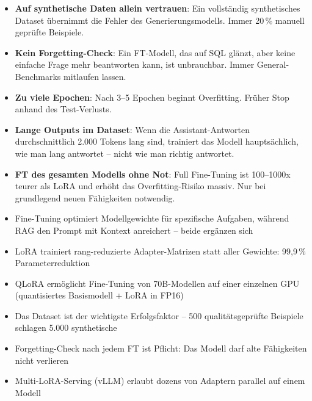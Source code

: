 \begin{itemize}[leftmargin=*]
    \item \textbf{Auf synthetische Daten allein vertrauen}: Ein vollständig synthetisches Dataset übernimmt die Fehler des Generierungsmodells. Immer 20\,\% manuell geprüfte Beispiele.
    \item \textbf{Kein Forgetting-Check}: Ein FT-Modell, das auf SQL glänzt, aber keine einfache Frage mehr beantworten kann, ist unbrauchbar. Immer General-Benchmarks mitlaufen lassen.
    \item \textbf{Zu viele Epochen}: Nach 3--5 Epochen beginnt Overfitting. Früher Stop anhand des Test-Verlusts.
    \item \textbf{Lange Outputs im Dataset}: Wenn die Assistant-Antworten durchschnittlich 2.000 Tokens lang sind, trainiert das Modell hauptsächlich, wie man lang antwortet -- nicht wie man richtig antwortet.
    \item \textbf{FT des gesamten Modells ohne Not}: Full Fine-Tuning ist 100--1000x teurer als LoRA und erhöht das Overfitting-Risiko massiv. Nur bei grundlegend neuen Fähigkeiten notwendig.
\end{itemize}

\begin{zusammenfassung}
\begin{itemize}[leftmargin=*]
    \item Fine-Tuning optimiert Modellgewichte für spezifische Aufgaben, während RAG den Prompt mit Kontext anreichert -- beide ergänzen sich
    \item LoRA trainiert rang-reduzierte Adapter-Matrizen statt aller Gewichte: 99,9\,\% Parameterreduktion
    \item QLoRA ermöglicht Fine-Tuning von 70B-Modellen auf einer einzelnen GPU (quantisiertes Basismodell + LoRA in FP16)
    \item Das Dataset ist der wichtigste Erfolgsfaktor -- 500 qualitätsgeprüfte Beispiele schlagen 5.000 synthetische
    \item Forgetting-Check nach jedem FT ist Pflicht: Das Modell darf alte Fähigkeiten nicht verlieren
    \item Multi-LoRA-Serving (vLLM) erlaubt dozens von Adaptern parallel auf einem Modell
\end{itemize}
\end{zusammenfassung}

